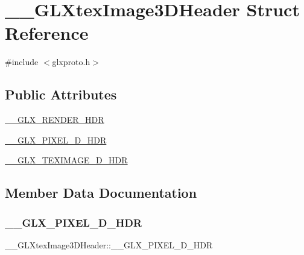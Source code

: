 \hypertarget{struct_____g_l_xtex_image3_d_header}{}\section{\+\_\+\+\_\+\+G\+L\+Xtex\+Image3\+D\+Header Struct Reference}
\label{struct_____g_l_xtex_image3_d_header}


{\ttfamily \#include $<$glxproto.\+h$>$}

\subsection*{Public Attributes}
\begin{DoxyCompactItemize}
\item 
\hyperlink{struct_____g_l_xtex_image3_d_header_ac7cdceed8a069d743d03a596964578b3}{\+\_\+\+\_\+\+G\+L\+X\+\_\+\+R\+E\+N\+D\+E\+R\+\_\+\+H\+DR}
\item 
\hyperlink{struct_____g_l_xtex_image3_d_header_a555b5001ea9628b88445324c374b0660}{\+\_\+\+\_\+\+G\+L\+X\+\_\+\+P\+I\+X\+E\+L\+\_\+D\+\_\+\+H\+DR}
\item 
\hyperlink{struct_____g_l_xtex_image3_d_header_a259733267e28ae50b0a2b5925afa9dc8}{\+\_\+\+\_\+\+G\+L\+X\+\_\+\+T\+E\+X\+I\+M\+A\+G\+E\+\_\+D\+\_\+\+H\+DR}
\end{DoxyCompactItemize}


\subsection{Member Data Documentation}
\mbox{\label{struct_____g_l_xtex_image3_d_header_a555b5001ea9628b88445324c374b0660}} 
\subsubsection{\texorpdfstring{\+\_\+\+\_\+\+G\+L\+X\+\_\+\+P\+I\+X\+E\+L\+\_\+D\+\_\+\+H\+DR}{\_\_GLX\_PIXEL\_3D\_HDR}}
{\footnotesize\ttfamily \+\_\+\+\_\+\+G\+L\+Xtex\+Image3\+D\+Header\+::\+\_\+\+\_\+\+G\+L\+X\+\_\+\+P\+I\+X\+E\+L\+\_\+D\+\_\+\+H\+DR}

